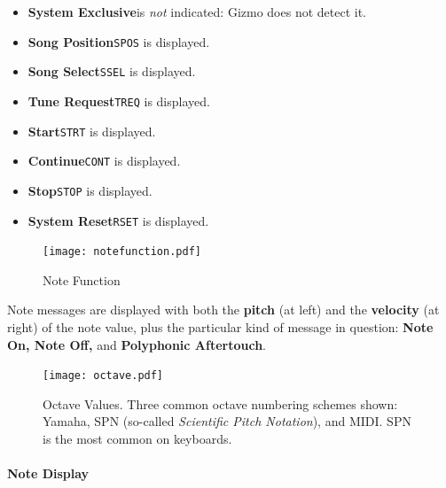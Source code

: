 \documentclass{article}
\begin{document}
\begin{itemize}
\begin{center}
\begin{tabular}{@{}rlll@{}}
\end{tabular}\end{center}
\item {\bf System Exclusive}\quad is {\it not} indicated: Gizmo does not detect it.
\item {\bf Song Position}\quad \texttt{SPOS} is displayed.
\item {\bf Song Select}\quad \texttt{SSEL} is displayed.
\item {\bf Tune Request}\quad \texttt{TREQ} is displayed.
\item {\bf Start}\quad \texttt{STRT} is displayed.
\item {\bf Continue}\quad \texttt{CONT} is displayed.
\item {\bf Stop}\quad \texttt{STOP} is displayed.
\item {\bf System Reset}\quad \texttt{RSET} is displayed.
\end{itemize}


\begin{figure}
\vspace{-37em}\texttt{[image: notefunction.pdf]}
\vspace{-2em}\caption{\small Note Function}
\label{notefunction}
\end{figure}


Note messages are displayed with both the {\bf pitch} (at left) and the {\bf velocity} (at right) of the note value, plus the particular kind of message in question: {\bf Note On, Note Off,} and {\bf Polyphonic Aftertouch}.

\begin{figure}
\vspace{-32em}
\texttt{[image: octave.pdf]}
\vspace{-2em}\caption{\small Octave Values.  Three common octave numbering schemes shown: Yamaha, SPN (so-called {\it Scientific Pitch Notation}), and MIDI.  SPN is the most common on keyboards.}\vspace{-5em}
\label{octave}
\end{figure}



\paragraph{Note Display}
\end{document}
